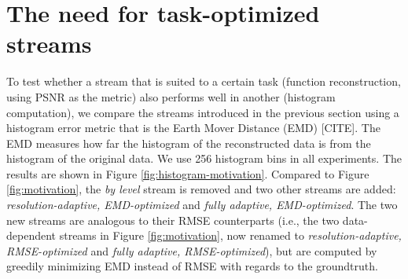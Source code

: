 \section{The need for task-optimized streams}
To test whether a stream that is suited to a certain task (function reconstruction, using PSNR as
the metric) also performs well in another (histogram computation), we compare the streams introduced
in the previous section using a histogram error metric that is the Earth Mover Distance (EMD)
[CITE]. The EMD measures how far the histogram of the reconstructed data is from the histogram of
the original data. We use 256 histogram bins in all experiments. The results are shown in Figure
\ref{fig:histogram-motivation}. Compared to Figure \ref{fig:motivation}, the \emph{by level} stream
is removed and two other streams are added: \emph{resolution-adaptive, EMD-optimized} and
\emph{fully adaptive, EMD-optimized}. The two new streams are analogous to their RMSE counterparts
(i.e., the two data-dependent streams in Figure \ref{fig:motivation}, now renamed to
\emph{resolution-adaptive, RMSE-optimized} and \emph{fully adaptive, RMSE-optimized}), but are
computed by greedily minimizing EMD instead of RMSE with regards to the groundtruth.


